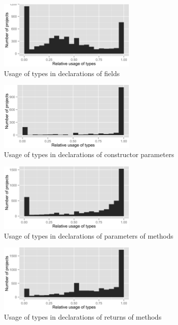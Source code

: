 \begin{figure}[h]
\centering 
\includegraphics[width=0.6\textwidth]{../aosd_2014/analysis/result/script/class/histograms/10_Field.png} 
\caption{Usage of types in declarations of fields}
\end{figure}

\begin{figure}[h]
\centering 
\includegraphics[width=0.6\textwidth]{../aosd_2014/analysis/result/script/class/histograms/9_Constructor_Parameter.png} 
\caption{Usage of types in declarations of constructor parameters}
\end{figure}

\begin{figure}[h]
\centering 
\includegraphics[width=0.6\textwidth]{../aosd_2014/analysis/result/script/class/histograms/8_Method_Parameter.png} 
\caption{Usage of types in declarations of parameters of methods}
\end{figure}

\begin{figure}[h]
\centering 
\includegraphics[width=0.6\textwidth]{../aosd_2014/analysis/result/script/class/histograms/7_Method_Return.png} 
\caption{Usage of types in declarations of returns of methods}
\end{figure}

